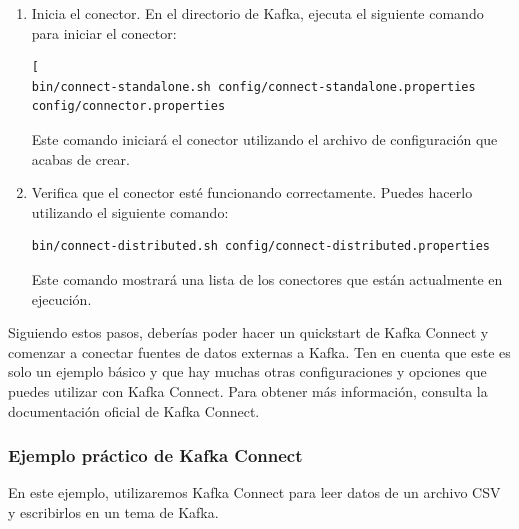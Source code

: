 \documentclass{article}
\begin{document}
\begin{enumerate}
\item Inicia el conector. En el directorio de Kafka, ejecuta el siguiente comando para iniciar el conector:
\begin{lstlisting}[numbers=none][
bin/connect-standalone.sh config/connect-standalone.properties config/connector.properties\end{lstlisting}
Este comando iniciará el conector utilizando el archivo de configuración que acabas de crear.

\item Verifica que el conector esté funcionando correctamente. Puedes hacerlo utilizando el siguiente comando:
\begin{lstlisting}[numbers=none]
bin/connect-distributed.sh config/connect-distributed.properties\end{lstlisting}
Este comando mostrará una lista de los conectores que están actualmente en ejecución.
\end{enumerate}

Siguiendo estos pasos, deberías poder hacer un quickstart de Kafka Connect y comenzar a conectar fuentes de datos externas a Kafka. Ten en cuenta que este es solo un ejemplo básico y que hay muchas otras configuraciones y opciones que puedes utilizar con Kafka Connect. Para obtener más información, consulta la documentación oficial de Kafka Connect.

\subsubsection{Ejemplo práctico de Kafka Connect}

En este ejemplo, utilizaremos Kafka Connect para leer datos de un archivo CSV y escribirlos en un tema de Kafka.
\end{document}
